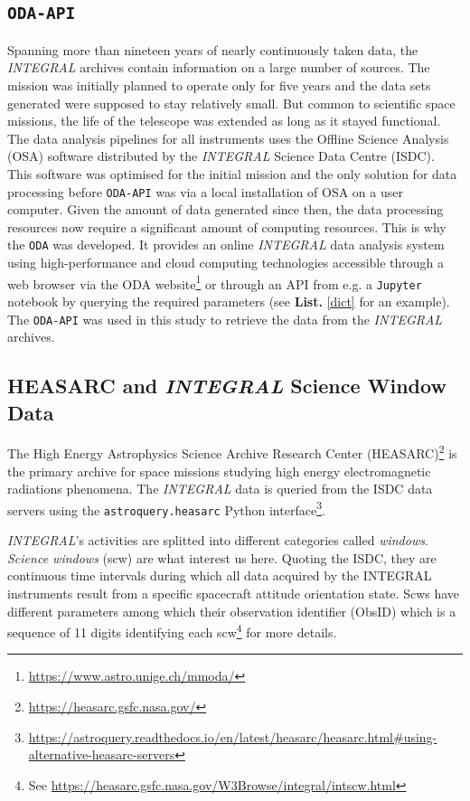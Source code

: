     \subsection{\texttt{ODA-API}}

    Spanning more than nineteen years of nearly continuously taken data, the \textit{INTEGRAL} archives contain information on a large number of sources. The mission was initially planned to operate only for five years and the data sets generated were supposed to stay relatively small. But common to scientific space missions, the life of the telescope was extended as long as it stayed functional. The data analysis pipelines for all instruments uses the Offline Science Analysis (OSA) software distributed by the \textit{INTEGRAL} Science Data Centre (ISDC). This software was optimised for the initial mission and the only solution for data processing before \texttt{ODA-API} was via a local installation of OSA on a user computer. Given the amount of data generated since then, the data processing resources now require a significant amount of computing resources. This is why the \texttt{ODA} was developed. It provides an online \textit{INTEGRAL} data analysis system using high-performance and cloud computing technologies accessible through a web browser via the ODA website\footnote{\url{https://www.astro.unige.ch/mmoda/}} or through an API from e.g. a \texttt{Jupyter} notebook by querying the required parameters (see \textbf{List.} \ref{dict} for an example). The \texttt{ODA-API} was used in this study to retrieve the data from the \textit{INTEGRAL} archives.

    \subsection{HEASARC and \textit{INTEGRAL} Science Window Data}

    The High Energy Astrophysics Science Archive Research Center (HEASARC)\footnote{\url{https://heasarc.gsfc.nasa.gov/}} is the primary archive for space missions studying high energy electromagnetic radiations phenomena. The \textit{INTEGRAL} data is queried from the ISDC data servers using the \texttt{astroquery.heasarc} Python interface\footnote{\url{https://astroquery.readthedocs.io/en/latest/heasarc/heasarc.html\#using-alternative-heasarc-servers}}.

    \textit{INTEGRAL}'s activities are splitted into different categories called \textit{windows}. \textit{Science windows} (scw) are what interest us here. Quoting the ISDC, they are continuous time intervals during which all data acquired by the INTEGRAL instruments result from a specific spacecraft attitude orientation state. Scws have different parameters among which their observation identifier (Obs\textunderscore ID) which is a sequence of 11 digits identifying each scw\footnote{See \url{https://heasarc.gsfc.nasa.gov/W3Browse/integral/intscw.html}} for more details.
    

